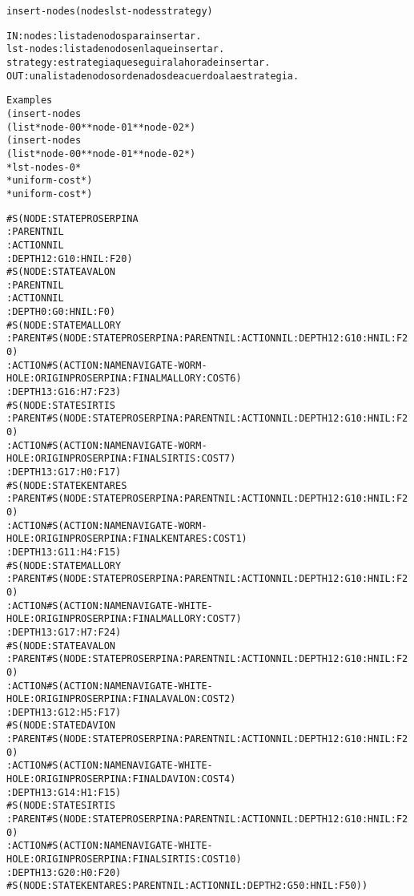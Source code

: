 \begin{aibox}{\function}
\begin{alltt}
insert-nodes (nodes lst-nodes strategy)


IN:     nodes: lista de nodos para insertar.
       lst-nodes:    lista de nodos en la que insertar.
       strategy:    estrategia que seguir a la hora de insertar.
OUT:    una lista de nodos ordenados de acuerdo a la estrategia.

\end{alltt}
\end{aibox}

\begin{aibox}{\examples}
\begin{alltt}
Examples
(insert-nodes 
    (list *node-00* *node-01* *node-02*) 
    (insert-nodes 
        (list *node-00* *node-01* *node-02*) 
        *lst-nodes-0*
        *uniform-cost*)
    *uniform-cost*)

\#S(NODE :STATE PROSERPINA 
 :PARENT NIL
 :ACTION NIL
 :DEPTH 12 :G 10 :H NIL :F 20)
\#S(NODE :STATE AVALON 
 :PARENT NIL
 :ACTION NIL
 :DEPTH 0 :G 0 :H NIL :F 0)
\#S(NODE :STATE MALLORY
 :PARENT \#S(NODE :STATE PROSERPINA :PARENT NIL :ACTION NIL :DEPTH 12 :G 10 :H NIL :F 20)
 :ACTION \#S(ACTION :NAME NAVIGATE-WORM-HOLE :ORIGIN PROSERPINA :FINAL MALLORY :COST 6)
 :DEPTH 13 :G 16 :H 7 :F 23)
\#S(NODE :STATE SIRTIS
 :PARENT \#S(NODE :STATE PROSERPINA :PARENT NIL :ACTION NIL :DEPTH 12 :G 10 :H NIL :F 20)
 :ACTION \#S(ACTION :NAME NAVIGATE-WORM-HOLE :ORIGIN PROSERPINA :FINAL SIRTIS :COST 7)
 :DEPTH 13 :G 17 :H 0 :F 17)
\#S(NODE :STATE KENTARES
 :PARENT \#S(NODE :STATE PROSERPINA :PARENT NIL :ACTION NIL :DEPTH 12 :G 10 :H NIL :F 20)
 :ACTION \#S(ACTION :NAME NAVIGATE-WORM-HOLE :ORIGIN PROSERPINA :FINAL KENTARES :COST 1)
 :DEPTH 13 :G 11 :H 4 :F 15)
\#S(NODE :STATE MALLORY
 :PARENT \#S(NODE :STATE PROSERPINA :PARENT NIL :ACTION NIL :DEPTH 12 :G 10 :H NIL :F 20)
 :ACTION \#S(ACTION :NAME NAVIGATE-WHITE-HOLE :ORIGIN PROSERPINA :FINAL MALLORY :COST 7)
 :DEPTH 13 :G 17 :H 7 :F 24)
\#S(NODE :STATE AVALON
 :PARENT \#S(NODE :STATE PROSERPINA :PARENT NIL :ACTION NIL :DEPTH 12 :G 10 :H NIL :F 20)
 :ACTION \#S(ACTION :NAME NAVIGATE-WHITE-HOLE :ORIGIN PROSERPINA :FINAL AVALON :COST 2)
 :DEPTH 13 :G 12 :H 5 :F 17)
\#S(NODE :STATE DAVION
 :PARENT \#S(NODE :STATE PROSERPINA :PARENT NIL :ACTION NIL :DEPTH 12 :G 10 :H NIL :F 20)
 :ACTION \#S(ACTION :NAME NAVIGATE-WHITE-HOLE :ORIGIN PROSERPINA :FINAL DAVION :COST 4)
 :DEPTH 13 :G 14 :H 1 :F 15)
\#S(NODE :STATE SIRTIS
 :PARENT \#S(NODE :STATE PROSERPINA :PARENT NIL :ACTION NIL :DEPTH 12 :G 10 :H NIL :F 20)
 :ACTION \#S(ACTION :NAME NAVIGATE-WHITE-HOLE :ORIGIN PROSERPINA :FINAL SIRTIS :COST 10)
 :DEPTH 13 :G 20 :H 0 :F 20)
\#S(NODE :STATE KENTARES :PARENT NIL :ACTION NIL :DEPTH 2 :G 50 :H NIL :F 50))



\end{alltt}
\end{aibox}


